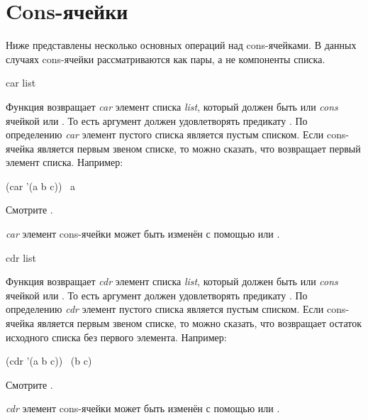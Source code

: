 \section{Cons-ячейки}

Ниже представлены несколько основных операций над cons-ячейками. В данных
случаях cons-ячейки рассматриваются как пары, а не компоненты списка.

\begin{defun}[Функция]
car list

Функция возвращает \emph{car} элемент списка \emph{list}, который должен быть
или \emph{cons} ячейкой или {\emptylist}. То есть аргумент должен удовлетворять
предикату .
По определению \emph{car} элемент пустого списка является пустым списком.
Если cons-ячейка является первым звеном списке, то можно сказать, что 
возвращает первый элемент списка.
Например:
\begin{lisp}
(car '(a b c)) \EV\ a
\end{lisp}
Смотрите .

\emph{car} элемент cons-ячейки может быть изменён с помощью  или
.
\end{defun}

\begin{defun}[Функция]
cdr list

Функция возвращает \emph{cdr} элемент списка \emph{list}, который должен быть
или \emph{cons} ячейкой или {\emptylist}. То есть аргумент должен удовлетворять
предикату .
По определению \emph{cdr} элемент пустого списка является пустым списком.
Если cons-ячейка является первым звеном списке, то можно сказать, что 
возвращает остаток исходного списка без первого элемента.
Например:
\begin{lisp}
(cdr '(a b c)) \EV\ (b c)
\end{lisp}
Смотрите .

\emph{cdr} элемент cons-ячейки может быть изменён с помощью  или
.
\end{defun}


